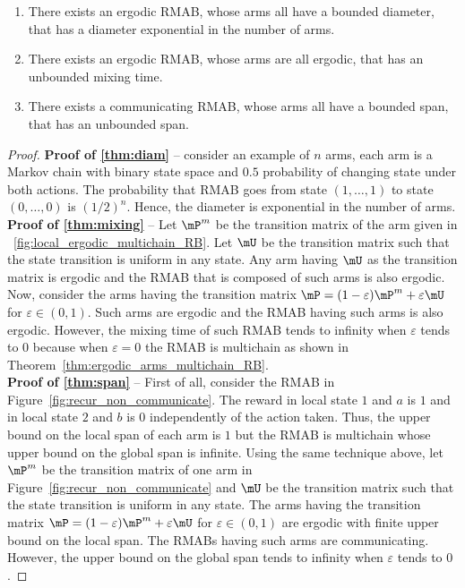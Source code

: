 \begin{thm}
    \begin{enumerate}[label=(\roman*)]
        \item \label{thm:diam} There exists an ergodic RMAB, whose arms all have a bounded diameter, that has a diameter exponential in the number of arms. %
        \item \label{thm:mixing} There exists an ergodic RMAB, whose arms are all ergodic, that has an unbounded mixing time.
        \item \label{thm:span} There exists a communicating RMAB, whose arms all have a bounded span, that has an unbounded span.
    \end{enumerate}
\end{thm}
\begin{proof}
    \textbf{Proof of \ref{thm:diam}} -- consider an example of $n$ arms, each arm is a Markov chain with binary state space and $0.5$ probability of changing state under both actions.
The probability that RMAB goes from state $(1,\dots,1)$ to state $(0,\dots,0)$ is $(1/2)^n$.
Hence, the diameter is exponential in the number of arms.
\medskip \\
\textbf{Proof of \ref{thm:mixing}} -- Let $\mP^m$ be the transition matrix of the arm given in \figurename~\ref{fig:local_ergodic_multichain_RB}.
Let $\mU$ be the transition matrix such that the state transition is uniform in any state.
Any arm having $\mU$ as the transition matrix is ergodic and the RMAB that is composed of such arms is also ergodic.
Now, consider the arms having the transition matrix $\mP=(1-\varepsilon)\mP^m +\varepsilon \mU$ for $\varepsilon\in(0,1)$.
Such arms are ergodic and the RMAB having such arms is also ergodic.
However, the mixing time of such RMAB tends to infinity when $\varepsilon$ tends to $0$ because when $\varepsilon=0$ the RMAB is multichain as shown in Theorem~\ref{thm:ergodic_arms_multichain_RB}.
\medskip \\
\textbf{Proof of \ref{thm:span}} -- First of all, consider the RMAB in Figure~\ref{fig:recur_non_communicate}.
The reward in local state $1$ and $a$ is $1$ and in local state $2$ and $b$ is $0$ independently of the action taken.
Thus, the upper bound on the local span of each arm is $1$ but the RMAB is multichain whose upper bound on the global span is infinite.
Using the same technique above, let $\mP^m$ be the transition matrix of one arm in Figure~\ref{fig:recur_non_communicate} and $\mU$ be the transition matrix such that the state transition is uniform in any state.
The arms having the transition matrix $\mP=(1-\varepsilon)\mP^m +\varepsilon \mU$ for $\varepsilon\in(0,1)$ are ergodic with finite upper bound on the local span. 
The RMABs having such arms are communicating.
However, the upper bound on the global span tends to infinity when $\varepsilon$ tends to $0$.
\end{proof}

